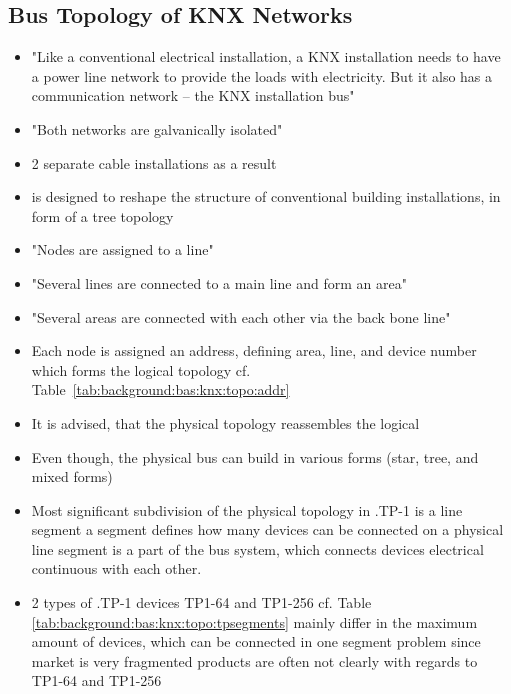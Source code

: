 	\subsection{Bus Topology of KNX Networks}
	\begin{itemize}
		\item "Like a conventional electrical installation, a KNX installation needs to have a power line network to provide the loads with electricity. But it also has a communication network – the KNX installation bus" \parencite{Merz2009}
		\item "Both networks are galvanically isolated" \parencite{Merz2009}
		\item 2 separate cable installations as a result
		\item \knx is designed to reshape the structure of conventional building installations, in form of a tree topology \parencite{Merz2009}
		\item "Nodes are assigned to a line" \parencite{Merz2009}
		\item "Several lines are connected to a main line and form an area" \parencite{Merz2009}
		\item "Several areas are connected with each other via the back bone line" \parencite{Merz2009}
		\item Each node is assigned an address, defining area, line, and device number which forms the logical topology
			\subitem cf. Table~\ref{tab:background:bas:knx:topo:addr}
		\item It is advised, that the physical topology reassembles the logical \parencite{Sokollik2017}
		\item Even though, the physical \knx bus can build in various forms (star, tree, and mixed forms) \parencite{Sokollik2017}
		\item Most significant subdivision of the physical topology in \knx.TP-1 is a line segment \parencite{Sokollik2017}
			\subitem a segment defines how many \knx devices can be connected on a physical line \parencite{Sokollik2017}
			\subitem segment is a part of the bus system, which connects \knx devices electrical continuous with each other. \parencite{Sokollik2017}
		\item 2 types of \knx.TP-1 devices \parencite{Sokollik2017}
			\subitem TP1-64 and TP1-256 cf. Table \ref{tab:background:bas:knx:topo:tpsegments}
			\subitem mainly differ in the maximum amount of devices, which can be connected in one segment
			\subitem problem since market is very fragmented
			\subitem products are often not clearly with regards to TP1-64 and TP1-256

\end{itemize}
